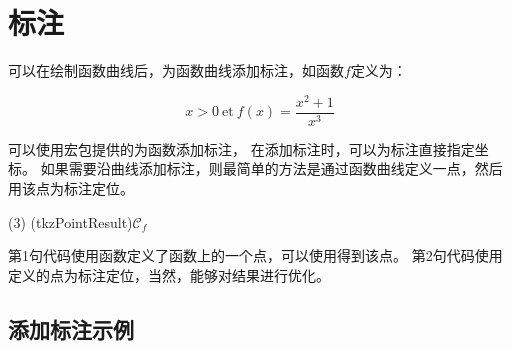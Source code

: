 \documentclass[../main.tex]{subfiles}
\begin{document}
\section{标注}

可以在绘制函数曲线后，为函数曲线添加标注，如函数$f$定义为：

\[
   x>0\ \text{et}\ f(x)=\dfrac{x^2+1}{x^3}
\]

可以使用宏包提供的为函数添加标注，
在添加标注时，可以为标注直接指定坐标。
如果需要沿曲线添加标注，则最简单的方法是通过函数曲线定义一点，然后用该点为标注定位。

\begin{tkzltxexample}[num]
  \tkzDefPointByFct(3)
  (tkzPointResult){${\mathcal{C}}_f$}
\end{tkzltxexample}

第1句代码使用函数定义了函数上的一个点，可以使用得到该点。
第2句代码使用定义的点为标注定位，当然，\TIKZ{}能够对结果进行优化。

\subsection{添加标注示例}

\begin{center}
\begin{tkzexample}[vbox]
\end{tkzexample}
\end{center}

\end{document}
